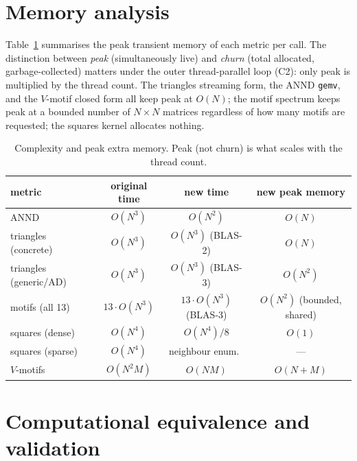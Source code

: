 \documentclass[11pt]{article}
\theoremstyle{plain}
\theoremstyle{definition}
\begin{document}
\section{Memory analysis}
\label{sec:memory}

Table~\ref{tab:memory} summarises the peak transient memory of each metric per call. The distinction between
\emph{peak} (simultaneously live) and \emph{churn} (total allocated, garbage-collected) matters under the
outer thread-parallel loop (C2): only peak is multiplied by the thread count. The triangles streaming form,
the ANND \texttt{gemv}, and the $V$-motif closed form all keep peak at $O(N)$; the motif spectrum keeps peak
at a bounded number of $N\times N$ matrices regardless of how many motifs are requested; the squares kernel
allocates nothing.

\begin{table}[t]
\centering
\small
\begin{tabular}{lccc}
\toprule
metric & original time & new time & new peak memory \\
\midrule
ANND                 & $O(N^3)$ & $O(N^2)$          & $O(N)$ \\
triangles (concrete) & $O(N^3)$ & $O(N^3)$ (BLAS-2) & $O(N)$ \\
triangles (generic/AD) & $O(N^3)$ & $O(N^3)$ (BLAS-3) & $O(N^2)$ \\
motifs (all 13)      & $13\cdot O(N^3)$ & $13\cdot O(N^3)$ (BLAS-3) & $O(N^2)$ (bounded, shared) \\
squares (dense)      & $O(N^4)$ & $O(N^4)/8$        & $O(1)$ \\
squares (sparse)     & $O(N^4)$ & neighbour enum.\  & --- \\
$V$-motifs           & $O(N^2M)$ & $O(NM)$          & $O(N+M)$ \\
\bottomrule
\end{tabular}
\caption{Complexity and peak extra memory. Peak (not churn) is what scales with the thread count.}
\label{tab:memory}
\end{table}

\section{Computational equivalence and validation}
\label{sec:validation}
\end{document}
